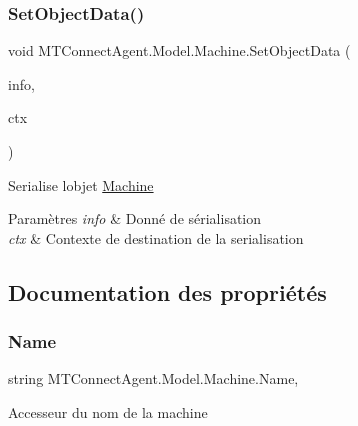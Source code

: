 \subsubsection{\texorpdfstring{Set\+Object\+Data()}{SetObjectData()}}
{\footnotesize\ttfamily void M\+T\+Connect\+Agent.\+Model.\+Machine.\+Set\+Object\+Data (\begin{DoxyParamCaption}\item[{Serialization\+Info}]{info,  }\item[{Streaming\+Context}]{ctx }\end{DoxyParamCaption})\hspace{0.3cm}{\ttfamily [inline]}}



Serialise l\textquotesingle{}objet \mbox{\hyperlink{class_m_t_connect_agent_1_1_model_1_1_machine}{Machine}} 


\begin{DoxyParams}{Paramètres}
{\em info} & Donné de sérialisation\\
\hline
{\em ctx} & Contexte de destination de la serialisation\\
\hline
\end{DoxyParams}


\subsection{Documentation des propriétés}
\mbox{\label{class_m_t_connect_agent_1_1_model_1_1_machine_aa70c7db4903ee28733408db9d6a2bd4a}} 
\subsubsection{\texorpdfstring{Name}{Name}}
{\footnotesize\ttfamily string M\+T\+Connect\+Agent.\+Model.\+Machine.\+Name\hspace{0.3cm}{\ttfamily [get]}, {\ttfamily [set]}}



Accesseur du nom de la machine 

\mbox{\label{class_m_t_connect_agent_1_1_model_1_1_machine_ad31a7be0d27dbfeb749bbf6874546a30}} 
